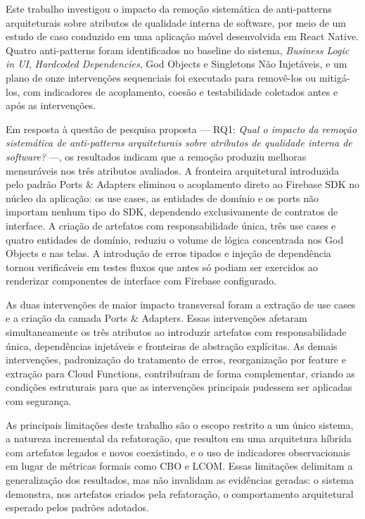 \documentclass[sigconf,anonymous]{acmart}
\begin{document}
Este trabalho investigou o impacto da remoção sistemática de anti-patterns arquiteturais sobre atributos de qualidade interna de software, por meio de um estudo de caso conduzido em uma aplicação móvel desenvolvida em React Native. Quatro anti-patterns foram identificados no baseline do sistema, \textit{Business Logic in UI}, \textit{Hardcoded Dependencies}, God Objects e Singletons Não Injetáveis, e um plano de onze intervenções sequenciais foi executado para removê-los ou mitigá-los, com indicadores de acoplamento, coesão e testabilidade coletados antes e após as intervenções.

Em resposta à questão de pesquisa proposta --- RQ1: \textit{Qual o impacto da remoção sistemática de anti-patterns arquiteturais sobre atributos de qualidade interna de software?} ---, os resultados indicam que a remoção produziu melhoras mensuráveis nos três atributos avaliados. A fronteira arquitetural introduzida pelo padrão Ports \& Adapters eliminou o acoplamento direto ao Firebase SDK no núcleo da aplicação: os use cases, as entidades de domínio e os ports não importam nenhum tipo do SDK, dependendo exclusivamente de contratos de interface. A criação de artefatos com responsabilidade única, três use cases e quatro entidades de domínio, reduziu o volume de lógica concentrada nos God Objects e nas telas. A introdução de erros tipados e injeção de dependência tornou verificáveis em testes fluxos que antes só podiam ser exercidos ao renderizar componentes de interface com Firebase configurado.

As duas intervenções de maior impacto transversal foram a extração de use cases e a criação da camada Ports \& Adapters. Essas intervenções afetaram simultaneamente os três atributos ao introduzir artefatos com responsabilidade única, dependências injetáveis e fronteiras de abstração explícitas. As demais intervenções, padronização do tratamento de erros, reorganização por feature e extração para Cloud Functions, contribuíram de forma complementar, criando as condições estruturais para que as intervenções principais pudessem ser aplicadas com segurança.

As principais limitações deste trabalho são o escopo restrito a um único sistema, a natureza incremental da refatoração, que resultou em uma arquitetura híbrida com artefatos legados e novos coexistindo, e o uso de indicadores observacionais em lugar de métricas formais como CBO e LCOM. Essas limitações delimitam a generalização dos resultados, mas não invalidam as evidências geradas: o sistema demonstra, nos artefatos criados pela refatoração, o comportamento arquitetural esperado pelos padrões adotados.
\end{document}
